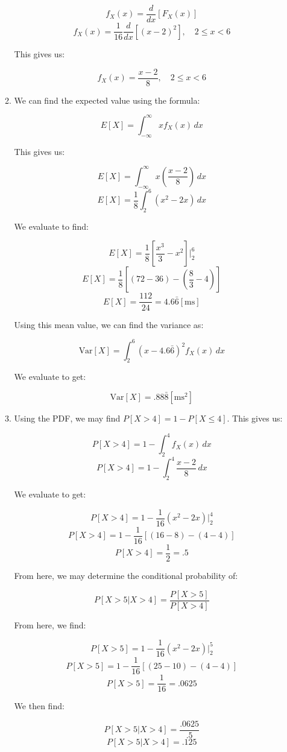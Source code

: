 \begin{enumerate}
\begin{enumerate}
        $$f_X(x)=\frac{d}{dx}\left[ F_X(x) \right]$$
        $$f_X(x)=\frac{1}{16}\frac{d}{dx}\left[ (x-2)^2 \right],\quad 2\leq x<6$$

        This gives us:

        $$\boxed{f_X(x)=\frac{x-2}{8},\quad 2\leq x<6}$$

      \item We can find the expected value using the formula:

        $$E[X]=\int_{-\infty}^{\infty} xf_X(x)\,dx$$

        This gives us:

        $$E[X]=\int_{-\infty}^{\infty} x\left( \frac{x-2}{8} \right)\,dx$$
        $$E[X]=\frac{1}{8}\int_{2}^{6} \left( x^2-2x \right)\,dx$$

        We evaluate to find:

        $$E[X]=\frac{1}{8}\left[\frac{x^3}{3}-x^2\right]\Big|_2^6$$
        $$E[X]=\frac{1}{8}\left[(72-36)-\left( \frac{8}{3}-4 \right)\right]$$
        $$\boxed{E[X]=\frac{112}{24}=4.6\bar{6}[\si{\milli\second}]}$$

        Using this mean value, we can find the variance as:

        $$\text{Var}[X]=\int_2^6 (x-4.6\bar{6})^2f_X(x)\,dx$$

        We evaluate to get:

        $$\boxed{\text{Var}[X]=.88\bar{8}[\si{\milli\second\squared}]}$$

      \item Using the PDF, we may find $P[X>4]=1-P[X\leq 4]$. This gives us:

        $$P[X>4]=1-\int_2^4 f_X(x)\,dx$$
        $$P[X>4]=1-\int_2^4 \frac{x-2}{8}\,dx$$

        We evaluate to get:

        $$P[X>4]=1-\frac{1}{16}(x^2-2x)\Big|_2^4$$
        $$P[X>4]=1-\frac{1}{16}[(16-8)-(4-4)]$$
        $$\boxed{P[X>4]=\frac{1}{2}=.5}$$

        From here, we may determine the conditional probability of:

        $$P[X>5|X>4]=\frac{P[X>5]}{P[X>4]}$$

        From here, we find:

        $$P[X>5]=1-\frac{1}{16}(x^2-2x)\Big|_2^5$$
        $$P[X>5]=1-\frac{1}{16}[(25-10)-(4-4)]$$
        $$\boxed{P[X>5]=\frac{1}{16}=.0625}$$

        We then find:

        $$P[X>5|X>4]=\frac{.0625}{.5}$$
        $$\boxed{P[X>5|X>4]=.125}$$


\end{enumerate}
\end{enumerate}
